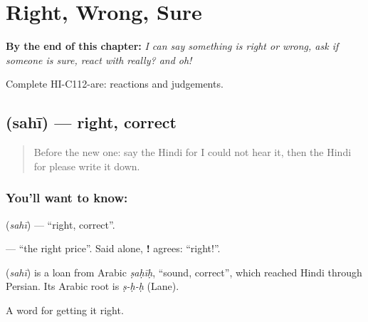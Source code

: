 
\chapter{Right, Wrong, Sure}
\label{ch:hi-right-wrong-sure}

\begin{chapteropening}
\textbf{By the end of this chapter:} \emph{I can say something is right or wrong, ask if someone is sure, react with really? and oh!}

Complete HI-C112-are: reactions and judgements.
\end{chapteropening}

\section[\texorpdfstring{\hi{सही} (sahī)}{सही (sahī)}]{ (sahī) — right, correct}

\label{lesson:HI-C112-sahi}



\begin{quote}
Before the new one: say the Hindi for I could not hear it, then the Hindi for please write it down.
\end{quote}

\subsection*{You'll want to know: }
\textbf{} (\emph{sahī}) — \textquotedblleft{}right, correct\textquotedblright{}.

\textbf{ } — \textquotedblleft{}the right price\textquotedblright{}. Said alone, \textbf{!} agrees: \textquotedblleft{}right!\textquotedblright{}.

\begin{cousinweb}
\textbf{} (\emph{sahī}) is a loan from Arabic \emph{ṣaḥīḥ}, \textquotedblleft{}sound, correct\textquotedblright{}, which reached Hindi through Persian. Its Arabic root is \emph{ṣ-ḥ-ḥ} (Lane).
\end{cousinweb}

\begin{grammarlens}[title={What you've built}]
A word for getting it right.
\end{grammarlens}

